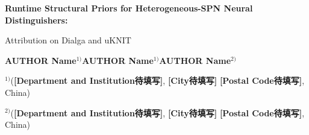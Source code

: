 \documentclass{templates/cjc-utf8}
\newcommand{\placeholder}[1]{\textbf{[#1待填写]}}
\begin{document}
\vspace{2mm}
\begin{center}
{\bfseries Runtime Structural Priors for Heterogeneous-SPN Neural Distinguishers:\par
Attribution on Dialga and uKNIT\par}
\vspace{1mm}
{\textbf{AUTHOR Name}$^{1)}$\quad \textbf{AUTHOR Name}$^{1)}$\quad \textbf{AUTHOR Name}$^{2)}$\par}
{$^{1)}$(\placeholder{Department and Institution}, \placeholder{City} \placeholder{Postal Code}, China)\par}
{$^{2)}$(\placeholder{Department and Institution}, \placeholder{City} \placeholder{Postal Code}, China)\par}
\end{center}
\end{document}
